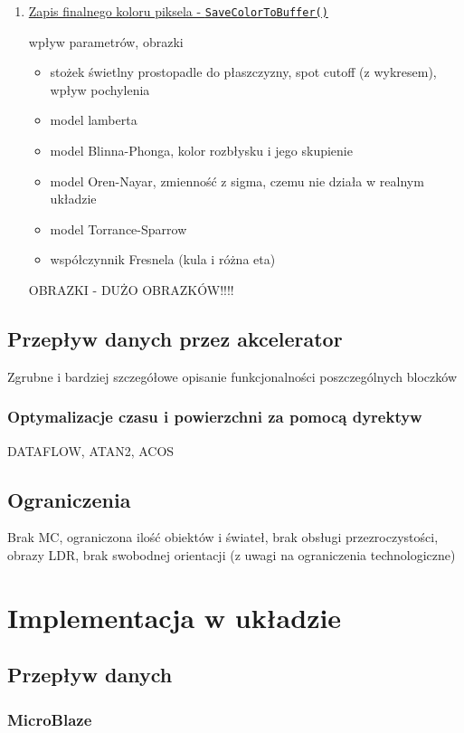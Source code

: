\begin{enumerate}
\item \underline{Zapis finalnego koloru piksela - \texttt{SaveColorToBuffer()}}







wpływ parametrów, obrazki
\begin{itemize}
\item stożek świetlny prostopadle do płaszczyzny, spot cutoff (z wykresem), wpływ pochylenia
\item model lamberta
\item model Blinna-Phonga, kolor rozbłysku i jego skupienie
\item model Oren-Nayar, zmienność z sigma, czemu nie działa w realnym układzie
\item model Torrance-Sparrow
\item współczynnik Fresnela (kula i różna eta)
\end{itemize}
{\color{red}OBRAZKI - DUŻO OBRAZKÓW!!!!}

\end{enumerate}

\subsection{Przepływ danych przez akcelerator}
Zgrubne i bardziej szczegółowe opisanie funkcjonalności poszczególnych bloczków
\subsubsection{Optymalizacje czasu i powierzchni za pomocą dyrektyw}
DATAFLOW, ATAN2, ACOS

\subsection{Ograniczenia}
Brak MC, ograniczona ilość obiektów i świateł, brak obsługi przezroczystości, obrazy LDR, brak swobodnej orientacji (z uwagi na ograniczenia technologiczne)

\section{Implementacja w układzie}
\subsection{Przepływ danych}
\subsubsection{MicroBlaze}
